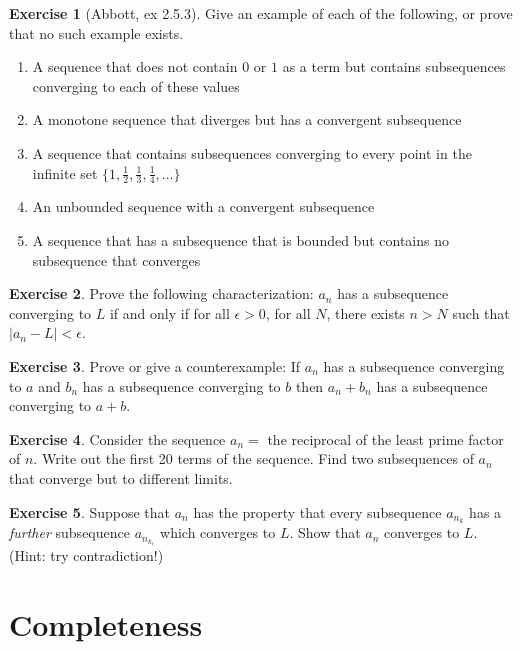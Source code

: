 \documentclass[11pt,oneside]{amsbook}
\theoremstyle{definition}
\newtheorem{exerc}{Exercise}[section]
\theoremstyle{plain}
\theoremstyle{definition}
\theoremstyle{remark}
\numberwithin{equation}{section}
\numberwithin{figure}{section}
\begin{document}
\begin{exerc}[Abbott, ex 2.5.3]
  Give an example of each of the following, or prove that no such example exists.
  \begin{enumerate}
    \item A sequence that does not contain $0$ or $1$ as a term but contains subsequences converging to each of these values
    \item A monotone sequence that diverges but has a convergent subsequence
    \item A sequence that contains subsequences converging to every point in the infinite set $\{1,\frac12,\frac13,\frac14,\ldots\}$
    \item An unbounded sequence with a convergent subsequence
    \item A sequence that has a subsequence that is bounded but contains no subsequence that converges
  \end{enumerate}
\end{exerc}

\begin{exerc}
  Prove the following characterization: $a_n$ has a subsequence converging to $L$ if and only if for all $\epsilon>0$, for all $N$, there exists $n>N$ such that $|a_n-L|<\epsilon$.
\end{exerc}

\begin{exerc}
  Prove or give a counterexample: If $a_n$ has a subsequence converging to $a$ and $b_n$ has a subsequence converging to $b$ then $a_n+b_n$ has a subsequence converging to $a+b$.
\end{exerc}

\begin{exerc}
  Consider the sequence $a_n=$ the reciprocal of the least prime factor of $n$. Write out the first 20 terms of the sequence. Find two subsequences of $a_n$ that converge but to different limits.
\end{exerc}

\begin{exerc}
  Suppose that $a_n$ has the property that every subsequence $a_{n_k}$ has a \emph{further} subsequence $a_{n_{k_\ell}}$ which converges to $L$.  Show that $a_n$ converges to $L$.  (Hint: try contradiction!)
\end{exerc}

\newpage
\section{Completeness}
\end{document}
